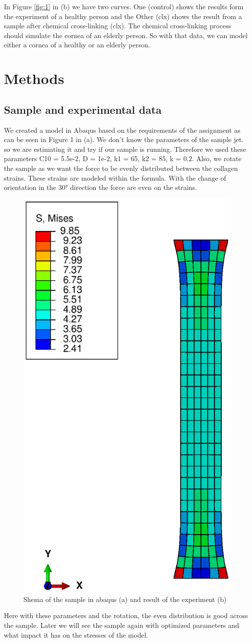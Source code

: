 \documentclass[12pt]{article}
\begin{document}
  In Figure \ref{fig:1} in (b) we have two curves. One (control) shows the results form the experiment of a healthy person and the Other (clx) shows the result from a sample after chemical cross-linking (clx). The chemical cross-linking process should simulate the cornea of an elderly person. So with that data, we can model either a cornea of a healthy or an elderly person.
\newpage
\section{Methods}

\subsection{Sample and experimental data}
We created a model in Abaqus based on the requirements of the assignment as can be seen in Figure 1 in (a). We don't know the parameters of the sample jet. so we are estimating it and try if our sample is running. Therefore we used these parameters C10 = 5.5e-2, D = 1e-2, k1 = 65, k2 = 85, k = 0.2. Also, we rotate the sample as we want the force to be evenly distributed between the collagen strains. These strains are modeled within the formula. With the change of orientation in the \ang{30} direction the force are even on the strains.
\begin{figure}[!htb]
  \centering
  \includegraphics[width=0.5\linewidth]{pics/s_mises_45}
 \caption{Shema of the sample in abaqus (a) and result of the experiment (b)}
  \label{fig:2}
\end{figure}
Here with these parameters and the rotation, the even distribution is good across the sample. Later we will see the sample again with optimized parameters and what impact it has on the stresses of the model.
\end{document}
